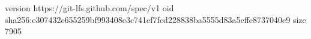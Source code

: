 version https://git-lfs.github.com/spec/v1
oid sha256:e307432e655259bf993408e3c741ef7fcd228838ba5555d83a5effe8737040e9
size 7905
